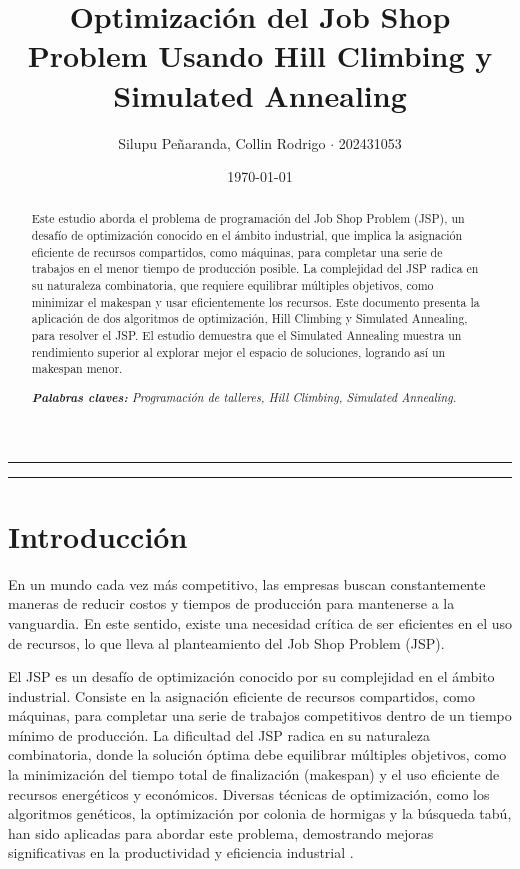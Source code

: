 \documentclass[11pt]{article}
\title{\LARGE\textbf{Optimización del Job Shop Problem Usando Hill Climbing y Simulated Annealing}}
\author{\normalsize{Silupu Peñaranda, Collin Rodrigo $\cdot$ 202431053}}
\date{\small{\today}}
\begin{document}
\renewcommand{\BOthers}[1]{et al.\hbox{}}


\maketitle


\hrule
\begin{abstract}
\noindent %
Este estudio aborda el problema de programación del Job Shop Problem (JSP), un desafío de optimización conocido en el ámbito industrial, que implica la asignación eficiente de recursos compartidos, como máquinas, para completar una serie de trabajos en el menor tiempo de producción posible. La complejidad del JSP radica en su naturaleza combinatoria, que requiere equilibrar múltiples objetivos, como minimizar el makespan y usar eficientemente los recursos. Este documento presenta la aplicación de dos algoritmos de optimización, Hill Climbing y Simulated Annealing, para resolver el JSP. El estudio demuestra que el Simulated Annealing muestra un rendimiento superior al explorar mejor el espacio de soluciones, logrando así un makespan menor. 

\noindent\textit{\textbf{Palabras claves:} Programación de talleres, Hill Climbing, Simulated Annealing.}

\end{abstract}

\hrule

\section{Introducción}

En un mundo cada vez más competitivo, las empresas buscan constantemente maneras de reducir costos y tiempos de producción para mantenerse a la vanguardia. En este sentido, existe una necesidad crítica de ser eficientes en el uso de recursos, lo que lleva al planteamiento del Job Shop Problem (JSP). 

\vspace{1em}
\noindent El JSP es un desafío de optimización conocido por su complejidad en el ámbito industrial. Consiste en la asignación eficiente de recursos compartidos, como máquinas, para completar una serie de trabajos competitivos dentro de un tiempo mínimo de producción. La dificultad del JSP radica en su naturaleza combinatoria, donde la solución óptima debe equilibrar múltiples objetivos, como la minimización del tiempo total de finalización (makespan) y el uso eficiente de recursos energéticos y económicos. Diversas técnicas de optimización, como los algoritmos genéticos, la optimización por colonia de hormigas y la búsqueda tabú, han sido aplicadas para abordar este problema, demostrando mejoras significativas en la productividad y eficiencia industrial \citep{tamssaouet2021, mokhtari2017, musser1993, yusof2011, scalia2023}.
\end{document}
